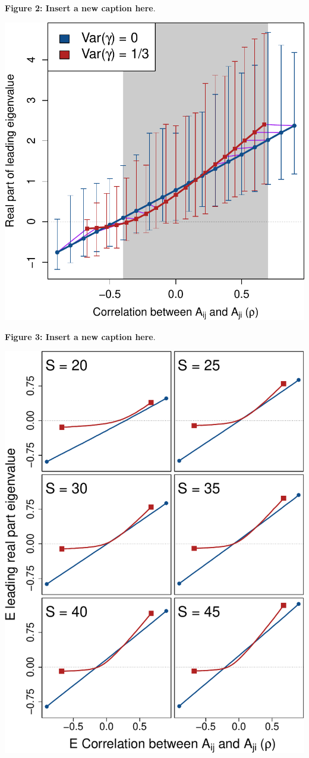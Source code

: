 \documentclass[]{article}
\begin{document}
\clearpage

\textbf{Figure 2: Insert a new caption here}.

\includegraphics{ms_files/figure-latex/unnamed-chunk-11-1.pdf}

\clearpage

\textbf{Figure 3: Insert a new caption here}.

\includegraphics{ms_files/figure-latex/unnamed-chunk-12-1.pdf}
\end{document}
